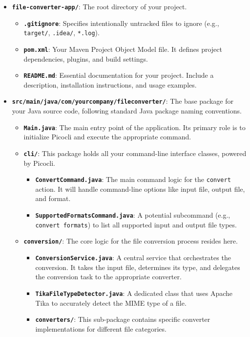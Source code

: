 \begin{itemize}
\item
  \textbf{\texttt{file-converter-app/}}: The root directory of your
  project.

  \begin{itemize}
  \tightlist
  \item
    \textbf{\texttt{.gitignore}}: Specifies intentionally untracked
    files to ignore (e.g., \texttt{target/}, \texttt{.idea/},
    \texttt{*.log}).
  \item
    \textbf{\texttt{pom.xml}}: Your Maven Project Object Model file. It
    defines project dependencies, plugins, and build settings.
  \item
    \textbf{\texttt{README.md}}: Essential documentation for your
    project. Include a description, installation instructions, and usage
    examples.
  \end{itemize}
\item
  \textbf{\texttt{src/main/java/com/yourcompany/fileconverter/}}: The
  base package for your Java source code, following standard Java
  package naming conventions.

  \begin{itemize}
  \item
    \textbf{\texttt{Main.java}}: The main entry point of the
    application. Its primary role is to initialize Picocli and execute
    the appropriate command.
  \item
    \textbf{\texttt{cli/}}: This package holds all your command-line
    interface classes, powered by Picocli.

    \begin{itemize}
    \tightlist
    \item
      \textbf{\texttt{ConvertCommand.java}}: The main command logic for
      the \texttt{convert} action. It will handle command-line options
      like input file, output file, and format.
    \item
      \textbf{\texttt{SupportedFormatsCommand.java}}: A potential
      subcommand (e.g., \texttt{convert\ formats}) to list all supported
      input and output file types.
    \end{itemize}
  \item
    \textbf{\texttt{conversion/}}: The core logic for the file
    conversion process resides here.

    \begin{itemize}
    \tightlist
    \item
      \textbf{\texttt{ConversionService.java}}: A central service that
      orchestrates the conversion. It takes the input file, determines
      its type, and delegates the conversion task to the appropriate
      converter.
    \item
      \textbf{\texttt{TikaFileTypeDetector.java}}: A dedicated class
      that uses Apache Tika to accurately detect the MIME type of a
      file.
    \item
      \textbf{\texttt{converters/}}: This sub-package contains specific
      converter implementations for different file categories.


\end{itemize}
\end{itemize}
\end{itemize}
